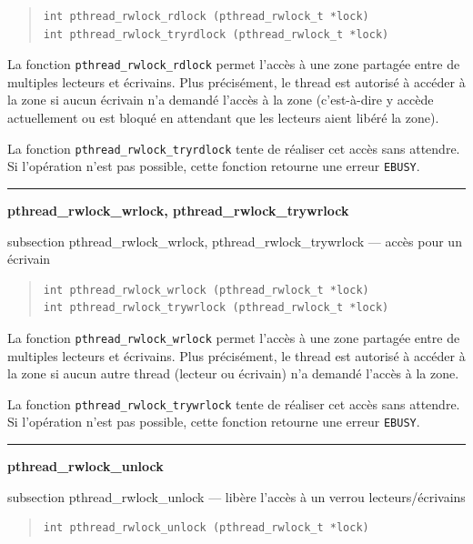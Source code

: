 \documentclass [twoside] {report}
\newcommand {\primitive} [1]
    {
	\phantomsection
	{\large \textbf {#1}}
	\addcontentsline {toc} {subsection} {#1}
    }
\newcommand {\separation}
    {
	\vspace {5mm}
	\nopagebreak
	\hrule
    }
\begin{document}
\begin {quote}
\begin {verbatim}
int pthread_rwlock_rdlock (pthread_rwlock_t *lock)
int pthread_rwlock_tryrdlock (pthread_rwlock_t *lock)
\end{verbatim}
\end {quote}

La fonction \verb|pthread_rwlock_rdlock| permet l'accès à une zone
partagée entre de multiples lecteurs et écrivains. Plus précisément,
le thread est autorisé à accéder à la zone si aucun écrivain n'a
demandé l'accès à la zone (c'est-à-dire y accède actuellement ou
est bloqué en attendant que les lecteurs aient libéré la zone).

La fonction \verb|pthread_rwlock_tryrdlock| tente de réaliser cet accès
sans attendre. Si l'opération n'est pas possible, cette fonction retourne
une erreur \texttt {EBUSY}.


\separation
\primitive {pthread\_rwlock\_wrlock, pthread\_rwlock\_trywrlock} --- accès pour un écrivain

\begin {quote}
\begin {verbatim}
int pthread_rwlock_wrlock (pthread_rwlock_t *lock)
int pthread_rwlock_trywrlock (pthread_rwlock_t *lock)
\end{verbatim}
\end {quote}

La fonction \verb|pthread_rwlock_wrlock| permet l'accès à une zone
partagée entre de multiples lecteurs et écrivains. Plus précisément,
le thread est autorisé à accéder à la zone si aucun autre thread
(lecteur ou écrivain) n'a demandé l'accès à la zone.

La fonction \verb|pthread_rwlock_trywrlock| tente de réaliser cet
accès sans attendre.  Si l'opération n'est pas possible, cette fonction
retourne une erreur \texttt {EBUSY}.



\separation
\primitive {pthread\_rwlock\_unlock} --- libère l'accès à un verrou
lecteurs/écrivains

\begin {quote}
\begin {verbatim}
int pthread_rwlock_unlock (pthread_rwlock_t *lock)
\end{verbatim}
\end {quote}
\end{document}
